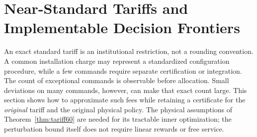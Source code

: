 \section{Near-Standard Tariffs and Implementable Decision Frontiers}\label{sec:robust63}
An exact standard tariff is an institutional restriction, not a rounding convention. A common installation charge may represent a standardized configuration procedure, while a few commands require separate certification or integration. The count of exceptional commands is observable before allocation. Small deviations on many commands, however, can make that exact count large. This section shows how to approximate such fees while retaining a certificate for the \emph{original} tariff and the original physical policy. The physical assumptions of Theorem~\ref{thm:tariff60} are needed for its tractable inner optimization; the perturbation bound itself does not require linear rewards or free service.

